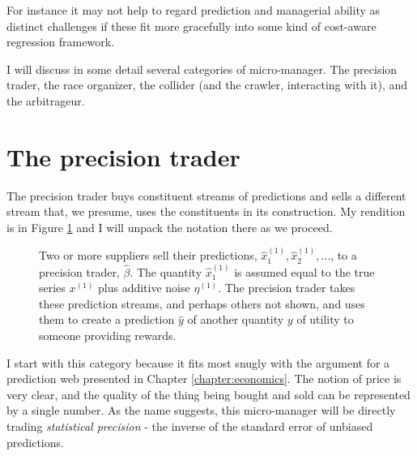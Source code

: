 For instance it may not help to regard prediction and managerial ability as distinct challenges if these fit more gracefully into some kind of cost-aware regression framework. 

I will discuss in some detail several categories of micro-manager. The precision trader, the race organizer, the collider (and the crawler, interacting with it), and the arbitrageur. 


\section{The precision trader}
\label{sec:regression}


The precision trader buys constituent streams of predictions and sells a different stream that, we presume, uses the constituents in its construction. My rendition is in Figure \ref{fig:errors_in_vars} and I will unpack the notation there as we proceed. 

\begin{figure}[htp]
\centering
\iftikz 
{}
\else 
\fi 
\caption{Two or more suppliers sell their predictions, $\hat{x}^{(1)}_1,\hat{x}^{(1)}_2,\dots$, to a precision trader, $\hat{\beta}$. The quantity $\hat{x}^{(1)}_1$ is assumed equal to the true series $x^{(1)}$ plus additive noise $\eta^{(1)}$. The precision trader takes these prediction streams, and perhaps others not shown, and uses them to create a prediction $\hat{y}$ of another quantity $y$ of utility to someone providing rewards.}
\label{fig:errors_in_vars}
\end{figure}


I start with this category because it fits most snugly with the argument for a prediction web presented in Chapter \ref{chapter:economics}. The notion of price is very clear, and the quality of the thing being bought and sold can be represented by a single number. As the name suggests, this micro-manager will be directly trading {\em statistical precision} - the inverse of the standard error of unbiased predictions. 


